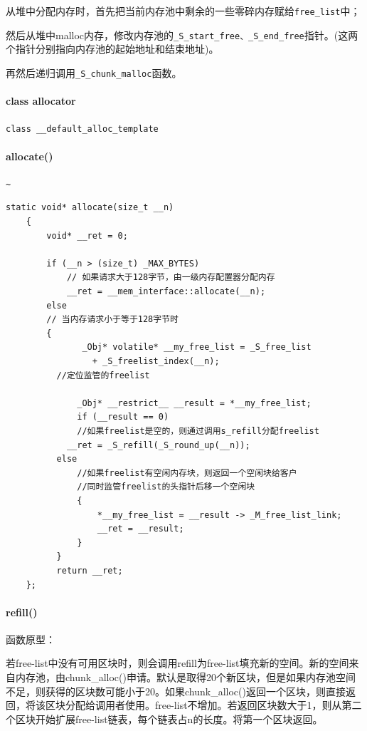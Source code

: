 \documentclass[UTF8,a4paper,12pt]{ctexbook}
\begin{document}
		从堆中分配内存时，首先把当前内存池中剩余的一些零碎内存赋给\verb|free_list|中；
		
		然后从堆中malloc内存，修改内存池的\verb|_S_start_free、_S_end_free|指针。(这两个指针分别指向内存池的起始地址和结束地址)。
		
		再然后递归调用\verb|_S_chunk_malloc|函数。
		　　
		\paragraph{class allocator}\verb|class __default_alloc_template|

		\paragraph{allocate()}\verb|~|
			\begin{lstlisting}[frame = lines]
	static void* allocate(size_t __n)  
	{  
	    void* __ret = 0;  
	        
	    if (__n > (size_t) _MAX_BYTES)   
	        // 如果请求大于128字节，由一级内存配置器分配内存  
	    	__ret = __mem_interface::allocate(__n);  
	    else   
	    // 当内存请求小于等于128字节时  
	    {  
	           _Obj* volatile* __my_free_list = _S_free_list   
	             + _S_freelist_index(__n);  
	      //定位监管的freelist  
	  
	          _Obj* __restrict__ __result = *__my_free_list;  
	          if (__result == 0)  
	          //如果freelist是空的，则通过调用s_refill分配freelist  
	        __ret = _S_refill(_S_round_up(__n));  
	      else   
	          //如果freelist有空闲内存块，则返回一个空闲块给客户  
	          //同时监管freelist的头指针后移一个空闲块  
	          {  
	              *__my_free_list = __result -> _M_free_list_link;  
	              __ret = __result;  
	          }  
	      }  
	      return __ret;  
	};  
			\end{lstlisting}

		\paragraph{refill()}
			函数原型：
			
			若free-list中没有可用区块时，则会调用refill为free-list填充新的空间。新的空间来自内存池，由chunk\_alloc()申请。默认是取得20个新区块，但是如果内存池空间不足，则获得的区块数可能小于20。如果chunk\_alloc()返回一个区块，则直接返回，将该区块分配给调用者使用。free-list不增加。若返回区块数大于1，则从第二个区块开始扩展free-list链表，每个链表占n的长度。将第一个区块返回。
			
\end{document}
